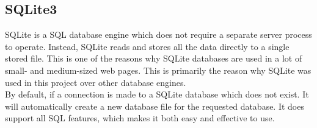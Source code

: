 \subsection{SQLite3}
SQLite\cite{sqlite3} is a SQL database engine which does not require a separate server process to operate. Instead, SQLite reads and stores all the data directly to a single stored file. This is one of the reasons why SQLite databases are used in a lot of small- and medium-sized web pages. This is primarily the reason why SQLite was used in this project over other database engines.
\\[11pt]
By default, if a connection is made to a SQLite database which does not exist. It will automatically create a new database file for the requested database. It does support all SQL features, which makes it both easy and effective to use.